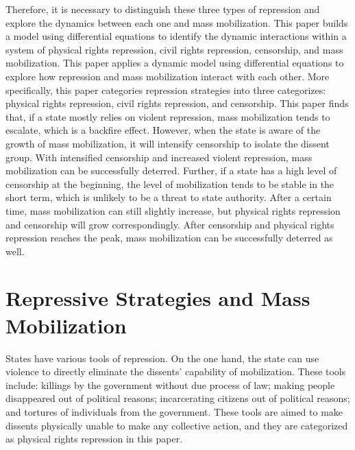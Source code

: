 \documentclass[11pt,]{article}
\begin{document}
Therefore, it is necessary to distinguish these three types of
repression and explore the dynamics between each one and mass
mobilization. This paper builds a model using differential equations to
identify the dynamic interactions within a system of physical rights
repression, civil rights repression, censorship, and mass mobilization.
This paper applies a dynamic model using differential equations to
explore how repression and mass mobilization interact with each other.
More specifically, this paper categories repression strategies into
three categorizes: physical rights repression, civil rights repression,
and censorship. This paper finds that, if a state mostly relies on
violent repression, mass mobilization tends to escalate, which is a
backfire effect. However, when the state is aware of the growth of mass
mobilization, it will intensify censorship to isolate the dissent group.
With intensified censorship and increased violent repression, mass
mobilization can be successfully deterred. Further, if a state has a
high level of censorship at the beginning, the level of mobilization
tends to be stable in the short term, which is unlikely to be a threat
to state authority. After a certain time, mass mobilization can still
slightly increase, but physical rights repression and censorship will
grow correspondingly. After censorship and physical rights repression
reaches the peak, mass mobilization can be successfully deterred as
well.

\vspace{3mm}

\section{Repressive Strategies and Mass Mobilization}

States have various tools of repression. On the one hand, the state can
use violence to directly eliminate the dissents' capability of
mobilization. These tools include: killings by the government without
due process of law; making people disappeared out of political reasons;
incarcerating citizens out of political reasons; and tortures of
individuals from the government. These tools are aimed to make dissents
physically unable to make any collective action, and they are
categorized as physical rights repression in this paper.
\end{document}
